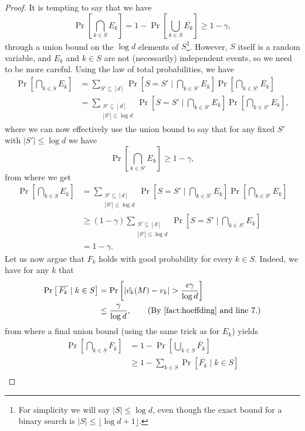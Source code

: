 \begin{proof}
It is tempting to say that we have 
\[ 
	\Pr\left[\bigcap_{k \in S} E_k\right] = 1 -  \Pr\left[\bigcup_{k \in S} \overline{E_k} \right] \geq 1 - \gamma,
\]
through a union bound on the $\log d$ elements of $S$\footnote{For simplicity we will say $|S| \leq \log d$, even though the exact bound for a binary search is $|S| \leq \lfloor \log d  + 1 \rfloor$.}. However, $S$ itself is a random variable, and $E_k$ and $k \in S$ are not (necessarily) independent events, so we need to be more careful. 
Using the law of total probabilities, we have 
\begin{align*}
	\Pr\left[\bigcap_{k \in S} E_k\right] &= \sum_{S' \subseteq [d]} \Pr\left[S = S'  \mid \bigcap_{k \in S'} E_k \right] \Pr\left[\bigcap_{k \in S'} E_k\right]\\
	&= \sum_{\substack{S' \subseteq [d]\\ |S'| \leq \log d}} \Pr\left[S = S' \mid \bigcap_{k \in S'} E_k\right] \Pr\left[\bigcap_{k \in S'} E_k\right],
\end{align*}
where we can now effectively use the union bound to say that for any fixed $S'$ with $|S'| \leq \log d$ we have
\[ 
	\Pr\left[\bigcap_{k \in S'} E_k \right] \geq 1 - \gamma,
\]
from where we get
\begin{align*}
	\Pr\left[\bigcap_{k \in S} E_k\right] &=  \sum_{\substack{S' \subseteq [d]\\ |S'| \leq \log d}} \Pr\left[S = S'\mid \bigcap_{k \in S'} E_k\right] \Pr\left[\bigcap_{k \in S'} E_k\right]\\
	&\geq (1-\gamma) \sum_{\substack{S' \subseteq [d]\\ |S'| \leq \log d}} \Pr\left[S = S' \mid \bigcap_{k \in S'} E_k\right]\\
	&= 1 - \gamma.
\end{align*}
 Let us now argue that $F_k$ holds with good probability for every $k \in S$. Indeed, we have for any $k$ that
 \begin{align*}
 \Pr\left[ \, \overline{F_k} \mid k \in S \right] &= \Pr\left[|\hat{v_k}(M) - v_k| > \frac{\epsilon \gamma}{\log d}\right]\\
 	&\leq \frac{\gamma}{\log d}, \tag{By~\Cref{fact:hoeffding} and line 7.}
 \end{align*}
from where a final union bound (using the same trick as for $E_k$) yields 
\begin{align*}
	\Pr\left[\bigcap_{k \in S} F_k\right] &= 1 - \Pr\left[\bigcup_{k \in S} \overline{F_k}\right]\\
	&\geq 1 - \sum_{k \in S} \Pr\left[\overline{F_k} \mid k \in S\right]\\

\end{align*}
\end{proof}
